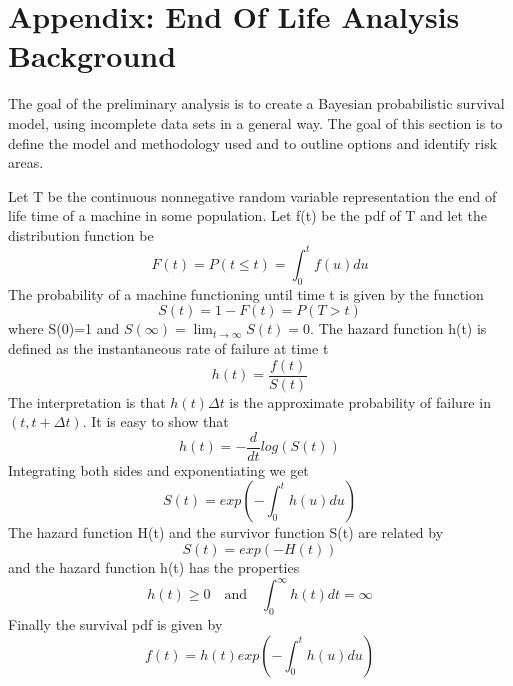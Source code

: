 \documentclass[english]{article}
\numberwithin{equation}{section}
\begin{document}
\newpage

\section*{Appendix: End Of Life Analysis Background}
The goal of the preliminary analysis is to create a Bayesian probabilistic survival model, using incomplete data sets in a general way.  The goal of this section is to define the model and methodology used and to outline options and identify risk areas.

Let T be the continuous nonnegative random variable representation the end of life time of a machine in some population.  Let f(t) be the pdf of T and let the distribution function be
\begin{equation}
F(t) = P( t \le t) = \int_0^t f(u) du
\end{equation}
The probability of a machine functioning until time t is given by the function
\begin{equation}
S(t) = 1 - F(t)=P(T>t)
\end{equation}
where S(0)=1 and $S(\infty)=\lim_{t \rightarrow \infty} S(t)=0$.  The hazard function h(t) is defined as the instantaneous rate of failure at time t
\begin{equation}
h(t)=\frac{f(t)}{S(t)}
\end{equation}
The interpretation is that $h(t)\Delta t$ is the approximate probability of failure in $(t, t+\Delta t)$.  It is easy to show that
\begin{equation}
h(t)=-\frac{d}{dt}log(S(t))
\end{equation}
Integrating both sides and exponentiating we get
\begin{equation}
S(t)=exp(-\int_0^t h(u) du)
\end{equation}
The hazard function H(t) and the survivor function S(t) are related by
\begin{equation}
S(t)=exp(-H(t))
\end{equation}
and the hazard function h(t) has the properties
\begin{equation}
h(t) \ge 0 \quad  \text{and} \quad  \int_0^\infty h(t)dt = \infty
\end{equation}
Finally the survival pdf is given by
\begin{equation}
f(t)=h(t)exp(-\int_0^t h(u) du)
\end{equation}
\end{document}
